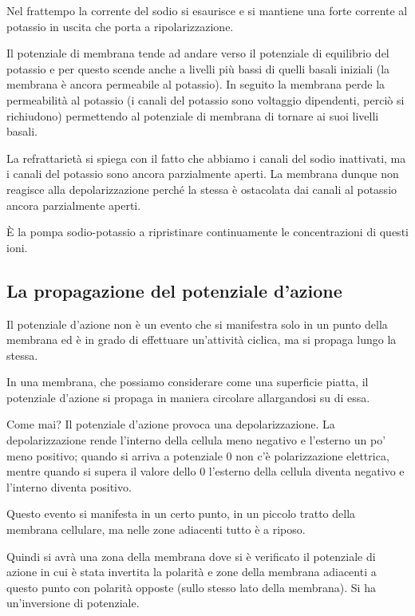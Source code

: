 \documentclass[]{article}
\begin{document}
Nel frattempo la corrente del sodio si esaurisce e si mantiene una forte
corrente al potassio in uscita che porta a ripolarizzazione.

Il potenziale di membrana tende ad andare verso il potenziale di
equilibrio del potassio e per questo scende anche a livelli più bassi di
quelli basali iniziali (la membrana è ancora permeabile al potassio). In
seguito la membrana perde la permeabilità al potassio (i canali del
potassio sono voltaggio dipendenti, perciò si richiudono) permettendo al
potenziale di membrana di tornare ai suoi livelli basali.

La refrattarietà si spiega con il fatto che abbiamo i canali del sodio
inattivati, ma i canali del potassio sono ancora parzialmente aperti. La
membrana dunque non reagisce alla depolarizzazione perché la stessa è
ostacolata dai canali al potassio ancora parzialmente aperti.

È la pompa sodio-potassio a ripristinare continuamente le concentrazioni
di questi ioni.

\subsection{La propagazione del potenziale
d'azione}\label{la-propagazione-del-potenziale-dazione}

Il potenziale d'azione non è un evento che si manifestra solo in un
punto della membrana ed è in grado di effettuare un'attività ciclica, ma
si propaga lungo la stessa.

In una membrana, che possiamo considerare come una superficie piatta, il
potenziale d'azione si propaga in maniera circolare allargandosi su di
essa.

Come mai? Il potenziale d'azione provoca una depolarizzazione. La
depolarizzazione rende l'interno della cellula meno negativo e l'esterno
un po' meno positivo; quando si arriva a potenziale 0 non c'è
polarizzazione elettrica, mentre quando si supera il valore dello 0
l'esterno della cellula diventa negativo e l'interno diventa positivo.

Questo evento si manifesta in un certo punto, in un piccolo tratto della
membrana cellulare, ma nelle zone adiacenti tutto è a riposo.

Quindi si avrà una zona della membrana dove si è verificato il
potenziale di azione in cui è stata invertita la polarità e zone della
membrana adiacenti a questo punto con polarità opposte (sullo stesso
lato della membrana). Si ha un'inversione di potenziale.
\end{document}
